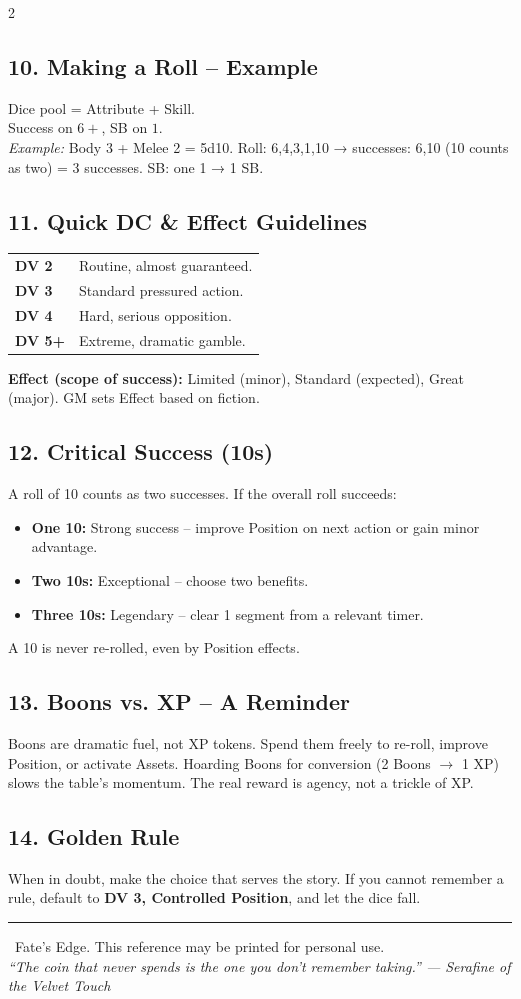 \documentclass[10pt,landscape]{article}
\begin{document}
\begin{multicols}{2}
\subsection*{10. Making a Roll – Example}
Dice pool = Attribute + Skill. \\
Success on $6+$, SB on $1$. \\
\emph{Example:} Body 3 + Melee 2 = 5d10. Roll: 6,4,3,1,10 → successes: 6,10 (10 counts as two) = 3 successes. SB: one 1 → 1 SB.

\subsection*{11. Quick DC \& Effect Guidelines}
\begin{tabularx}{\linewidth}{@{} l X @{}}
\textbf{DV 2} & Routine, almost guaranteed. \\
\textbf{DV 3} & Standard pressured action. \\
\textbf{DV 4} & Hard, serious opposition. \\
\textbf{DV 5+} & Extreme, dramatic gamble. \\
\end{tabularx}
\vspace{0.5ex}
\textbf{Effect (scope of success):} Limited (minor), Standard (expected), Great (major). GM sets Effect based on fiction.

\subsection*{12. Critical Success (10s)}
A roll of 10 counts as two successes. If the overall roll succeeds:
\begin{itemize}
    \item \textbf{One 10:} Strong success – improve Position on next action or gain minor advantage.
    \item \textbf{Two 10s:} Exceptional – choose two benefits.
    \item \textbf{Three 10s:} Legendary – clear 1 segment from a relevant timer.
\end{itemize}
A 10 is never re-rolled, even by Position effects.

\subsection*{13. Boons vs. XP – A Reminder}
Boons are dramatic fuel, not XP tokens. Spend them freely to re-roll, improve Position, or activate Assets. Hoarding Boons for conversion (2 Boons $\rightarrow$ 1 XP) slows the table's momentum. The real reward is agency, not a trickle of XP.

\subsection*{14. Golden Rule}
When in doubt, make the choice that serves the story. If you cannot remember a rule, default to \textbf{DV 3, Controlled Position}, and let the dice fall.

\end{multicols}
\vspace{1ex}
\hrule
\begin{center}
\small \textcopyright\ Fate's Edge. This reference may be printed for personal use. \\
\emph{“The coin that never spends is the one you don't remember taking.” --- Serafine of the Velvet Touch}
\end{center}
\end{document}
